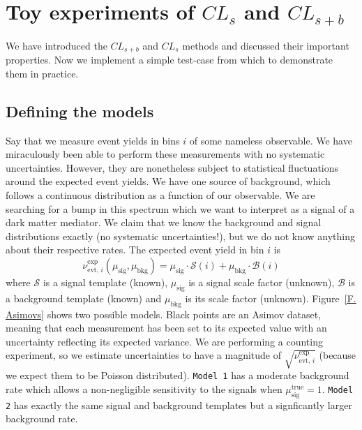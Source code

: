 \section{Toy experiments of $CL_s$ and $CL_{s+b}$}
\label{S. CLs In Action}

We have introduced the $CL_{s+b}$ and $CL_s$ methods and discussed their important properties. Now we implement a simple test-case from which to demonstrate them in practice.


\subsection{Defining the models}
\label{S. CLsInAction::Models}

Say that we measure event yields in bins $i$ of some nameless observable. We have miraculously been able to perform these measurements with no systematic uncertainties. However, they are nonetheless subject to statistical fluctuations around the expected event yields. We have one source of background, which follows a continuous distribution as a function of our observable. We are searching for a bump in this spectrum which we want to interpret as a signal of a dark matter mediator. We claim that we know the background and signal distributions exactly (no systematic uncertainties!), but we do not know anything about their respective rates. The expected event yield in bin $i$ is
\begin{equation}
\nu^\text{exp}_{\text{evt, }i}\left(\mu_\text{sig}, \mu_\text{bkg}\right) = \mu_\text{sig} \cdot \mathcal{S}\left(i\right) + \mu_\text{bkg} \cdot \mathcal{B}\left(i\right)
\label{E. ModelYields}
\end{equation}
where $\mathcal{S}$ is a signal template (known), $\mu_\text{sig}$ is a signal scale factor (unknown),  $\mathcal{B}$ is a background template (known) and $\mu_\text{bkg}$ is its scale factor (unknown). Figure~\ref{F. Asimovs} shows two possible models. Black points are an Asimov dataset, meaning that each measurement has been set to its expected value with an uncertainty reflecting its expected variance. We are performing a counting experiment, so we estimate uncertainties to have a magnitude of $\sqrt{\nu^\text{exp}_{\text{evt, }i}}$ (because we expect them to be Poisson distributed). \texttt{Model 1} has a moderate background rate which allows a non-negligible sensitivity to the signals when $\mu_\text{sig}^\text{true}=1$. \texttt{Model 2} has exactly the same signal and background templates but a signficantly larger background rate.

